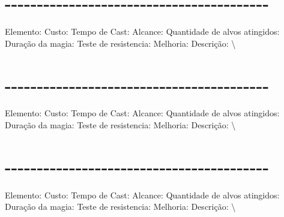 \documentclass{article}%
\begin{document}
%
\section{{-}{-}{-}{-}{-}{-}{-}{-}{-}{-}{-}{-}{-}{-}{-}{-}{-}{-}{-}{-}{-}{-}{-}{-}{-}{-}{-}{-}{-}{-}{-}{-}{-}{-}{-}{-}{-}{-}{-}{-}{-}}%
\label{sec:{-}{-}{-}{-}{-}{-}{-}{-}{-}{-}{-}{-}{-}{-}{-}{-}{-}{-}{-}{-}{-}{-}{-}{-}{-}{-}{-}{-}{-}{-}{-}{-}{-}{-}{-}{-}{-}{-}{-}{-}{-}}%
Elemento: \newline%
Custo: \newline%
Tempo de Cast: \newline%
Alcance: \newline%
Quantidade de alvos atingidos: \newline%
Duração da magia: \newline%
Teste de resistencia: \newline%
Melhoria: \newline%
Descrição: \textbackslash{}

%
\section{{-}{-}{-}{-}{-}{-}{-}{-}{-}{-}{-}{-}{-}{-}{-}{-}{-}{-}{-}{-}{-}{-}{-}{-}{-}{-}{-}{-}{-}{-}{-}{-}{-}{-}{-}{-}{-}{-}{-}{-}{-}}%
\label{sec:{-}{-}{-}{-}{-}{-}{-}{-}{-}{-}{-}{-}{-}{-}{-}{-}{-}{-}{-}{-}{-}{-}{-}{-}{-}{-}{-}{-}{-}{-}{-}{-}{-}{-}{-}{-}{-}{-}{-}{-}{-}}%
Elemento: \newline%
Custo: \newline%
Tempo de Cast: \newline%
Alcance: \newline%
Quantidade de alvos atingidos: \newline%
Duração da magia: \newline%
Teste de resistencia: \newline%
Melhoria: \newline%
Descrição: \textbackslash{}

%
\section{{-}{-}{-}{-}{-}{-}{-}{-}{-}{-}{-}{-}{-}{-}{-}{-}{-}{-}{-}{-}{-}{-}{-}{-}{-}{-}{-}{-}{-}{-}{-}{-}{-}{-}{-}{-}{-}{-}{-}{-}{-}}%
\label{sec:{-}{-}{-}{-}{-}{-}{-}{-}{-}{-}{-}{-}{-}{-}{-}{-}{-}{-}{-}{-}{-}{-}{-}{-}{-}{-}{-}{-}{-}{-}{-}{-}{-}{-}{-}{-}{-}{-}{-}{-}{-}}%
Elemento: \newline%
Custo: \newline%
Tempo de Cast: \newline%
Alcance: \newline%
Quantidade de alvos atingidos: \newline%
Duração da magia: \newline%
Teste de resistencia: \newline%
Melhoria: \newline%
Descrição: \textbackslash{}
\end{document}
